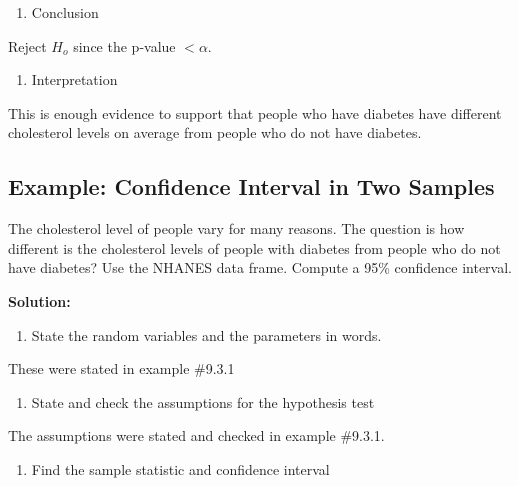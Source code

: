 \documentclass[
]{book}
\providecommand{\tightlist}{%
  \setlength{\itemsep}{0pt}\setlength{\parskip}{0pt}}
\begin{document}
\begin{enumerate}
\def\labelenumi{\arabic{enumi}.}
\setcounter{enumi}{4}
\tightlist
\item
  Conclusion
\end{enumerate}

Reject \(H_o\) since the p-value \(<\alpha\).

\begin{enumerate}
\def\labelenumi{\arabic{enumi}.}
\setcounter{enumi}{5}
\tightlist
\item
  Interpretation
\end{enumerate}

This is enough evidence to support that people who have diabetes have different cholesterol levels on average from people who do not have diabetes.

\hypertarget{example-confidence-interval-in-two-samples}{%
\subsection{Example: Confidence Interval in Two Samples}\label{example-confidence-interval-in-two-samples}}

The cholesterol level of people vary for many reasons. The question is how different is the cholesterol levels of people with diabetes from people who do not have diabetes? Use the NHANES data frame. Compute a 95\% confidence interval.

\textbf{Solution:}

\begin{enumerate}
\def\labelenumi{\arabic{enumi}.}
\tightlist
\item
  State the random variables and the parameters in words.
\end{enumerate}

These were stated in example \#9.3.1

\begin{enumerate}
\def\labelenumi{\arabic{enumi}.}
\setcounter{enumi}{1}
\tightlist
\item
  State and check the assumptions for the hypothesis test
\end{enumerate}

The assumptions were stated and checked in example \#9.3.1.

\begin{enumerate}
\def\labelenumi{\arabic{enumi}.}
\setcounter{enumi}{2}
\tightlist
\item
  Find the sample statistic and confidence interval
\end{enumerate}
\end{document}
